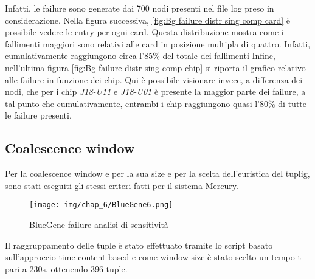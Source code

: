 Infatti, le failure sono generate dai 700 nodi presenti nel file log preso in considerazione.
Nella figura successiva, \ref{fig:Bg failure distr sing comp card} è possibile vedere le entry per ogni card. 
Questa distribuzione mostra come i fallimenti maggiori sono relativi alle card in posizione multipla di quattro. Infatti, cumulativamente raggiungono circa l'85\% del totale dei fallimenti
Infine, nell'ultima figura \ref{fig:Bg failure distr sing comp chip} si riporta il grafico relativo alle failure in funzione dei chip.
Qui è possibile visionare invece, a differenza dei nodi, che per i chip \textit{J18-U11} e \textit{J18-U01} è presente la maggior parte  dei failure, a tal punto che cumulativamente, entrambi i chip raggiungono quasi l'80\% di tutte le failure presenti.
\subsection{Coalescence window}
Per la coalescence window e per la sua size e per la scelta dell'euristica del tuplig, sono stati eseguiti gli stessi criteri fatti per il sistema Mercury.
 \begin{figure}[H]
	\centering
	\texttt{[image: img/chap\_6/BlueGene6.png]}
	\caption{BlueGene failure analisi di sensitività}
	\label{fig:BlueGene failure analisi di sensitività}
\end{figure}
\noindent
Il raggruppamento delle tuple è stato effettuato tramite lo script basato sull'approccio time content based e come window size è stato scelto un tempo t pari a 230s, ottenendo 396 tuple.
